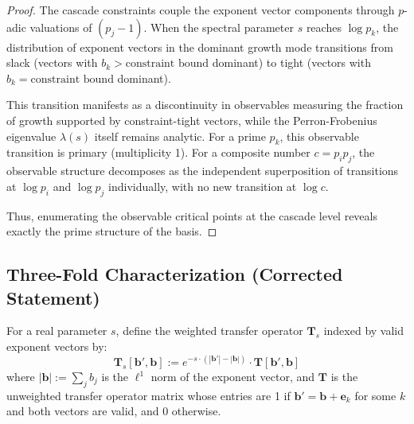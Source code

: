 \begin{proof}

The cascade constraints couple the exponent vector components through $p$-adic valuations of $(p_j - 1)$. When the spectral parameter $s$ reaches $\log p_k$, the distribution of exponent vectors in the dominant growth mode transitions from slack (vectors with $b_k > \text{constraint bound}$ dominant) to tight (vectors with $b_k = \text{constraint bound}$ dominant).

This transition manifests as a discontinuity in observables measuring the fraction of growth supported by constraint-tight vectors, while the Perron-Frobenius eigenvalue $\lambda(s)$ itself remains analytic. For a prime $p_k$, this observable transition is primary (multiplicity 1). For a composite number $c = p_i p_j$, the observable structure decomposes as the independent superposition of transitions at $\log p_i$ and $\log p_j$ individually, with no new transition at $\log c$.

Thus, enumerating the observable critical points at the cascade level reveals exactly the prime structure of the basis.

\end{proof}

\subsection{Three-Fold Characterization (Corrected Statement)}
\label{subsec:three-fold-corrected}

\begin{definition}
\label{def:weighted-transfer-operator}
For a real parameter $s$, define the weighted transfer operator $\mathbf{T}_s$ indexed by valid exponent vectors by:
\begin{equation}
\mathbf{T}_s[\mathbf{b}', \mathbf{b}] := e^{-s \cdot (|\mathbf{b}'| - |\mathbf{b}|)} \cdot \mathbf{T}[\mathbf{b}', \mathbf{b}]
\end{equation}
where $|\mathbf{b}| := \sum_j b_j$ is the $\ell^1$ norm of the exponent vector, and $\mathbf{T}$ is the unweighted transfer operator matrix whose entries are 1 if $\mathbf{b}' = \mathbf{b} + \mathbf{e}_k$ for some $k$ and both vectors are valid, and 0 otherwise.
\end{definition}

